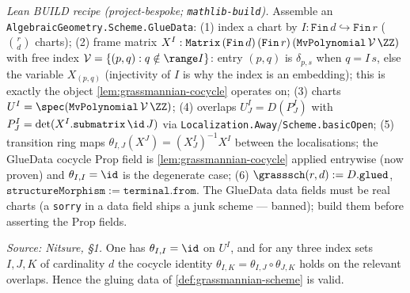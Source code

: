 \begin{definition}
  \emph{Lean BUILD recipe (project-bespoke; \texttt{mathlib-build}).} Assemble an
  \texttt{AlgebraicGeometry.Scheme.GlueData}:
  (1) index a chart by $I:\mathtt{Fin}\,d\hookrightarrow\mathtt{Fin}\,r$
  ($\binom rd$ charts);
  (2) frame matrix $X^I:\mathtt{Matrix}\,(\mathtt{Fin}\,d)\,(\mathtt{Fin}\,r)\,
  (\mathtt{MvPolynomial}\,\mathcal V\,\ZZ)$ with free index
  $\mathcal V=\{(p,q):q\notin\range I\}$: entry $(p,q)$ is $\delta_{p,s}$ when
  $q=I\,s$, else the variable $X_{(p,q)}$ (injectivity of $I$ is why the index is
  an embedding); this is exactly the object \cref{lem:grassmannian-cocycle}
  operates on;
  (3) charts $U^I=\spec(\mathtt{MvPolynomial}\,\mathcal V\,\ZZ)$;
  (4) overlaps $U^I_J=D(P^I_J)$ with $P^I_J=\det(X^I.\mathtt{submatrix}\,\id\,J)$
  via \texttt{Localization.Away}/\texttt{Scheme.basicOpen};
  (5) transition ring maps $\theta_{I,J}(X^J)=(X^I_J)^{-1}X^I$ between the
  localisations; the GlueData cocycle Prop field is \cref{lem:grassmannian-cocycle}
  applied entrywise (now proven) and $\theta_{I,I}=\id$ is the degenerate case;
  (6) $\grasssch(r,d):=D.\mathtt{glued}$, $\mathtt{structureMorphism}:=
  \mathtt{terminal.from}$. The GlueData data fields must be real charts (a
  \texttt{sorry} in a data field ships a junk scheme — banned); build them before
  asserting the Prop fields.
\end{definition}

\begin{lemma}
  \label{lem:grassmannian-cocycle}
  \textit{Source: Nitsure, §1.}
  One has $\theta_{I,I} = \id$ on $U^I$, and for any three index sets $I,J,K$ of
  cardinality $d$ the cocycle identity
  $\theta_{I,K} = \theta_{I,J}\circ\theta_{J,K}$ holds on the relevant overlaps.
  Hence the gluing data of \cref{def:grassmannian-scheme} is valid.
\end{lemma}

